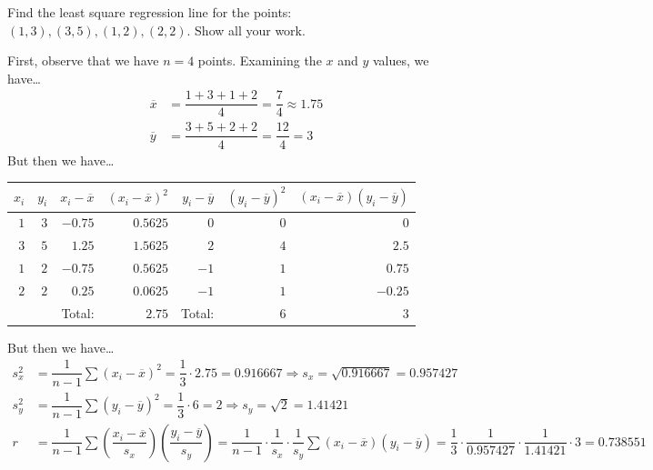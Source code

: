 \documentclass[11pt,letterpaper]{article}
\begin{document}
\newpage



 Find the least square regression line for the points: $(1, 3), (3, 5), (1, 2), (2, 2)$. Show all your work. \pspace

\sol First, observe that we have $n= 4$ points. Examining the $x$ and $y$ values, we have\dots
	\[
	\begin{aligned}
	\overline{x}&= \dfrac{1 + 3 + 1 + 2}{4}= \dfrac{7}{4} \approx 1.75 \\[0.3cm]
	\overline{y}&= \dfrac{3 + 5 + 2 + 2}{4}= \dfrac{12}{4}= 3
	\end{aligned}
	\]
But then we have\dots \par
	\begin{table}[!ht]
	\centering
	\begin{tabular}{rrrrrrr}
	\multicolumn{1}{r|}{$x_i$} & \multicolumn{1}{|r|}{$y_i$} & \multicolumn{1}{|r|}{$x_i - \overline{x}$} & \multicolumn{1}{|r|}{$(x_i - \overline{x})^2$} & \multicolumn{1}{|r|}{$y_i - \overline{y}$} & \multicolumn{1}{|r|}{$(y_i - \overline{y})^2$} & \multicolumn{1}{|r}{$(x_i - \overline{x})(y_i - \overline{y})$} \\ \hline
	\multicolumn{1}{r|}{$1$} & \multicolumn{1}{|r|}{$3$} & \multicolumn{1}{|r|}{$-0.75$} & \multicolumn{1}{|r|}{$0.5625$} & \multicolumn{1}{|r|}{$0$} & \multicolumn{1}{|r|}{$0$} & \multicolumn{1}{|r}{$0$} \\ 
	\multicolumn{1}{r|}{$3$} & \multicolumn{1}{|r|}{$5$} & \multicolumn{1}{|r|}{$1.25$} & \multicolumn{1}{|r|}{$1.5625$} & \multicolumn{1}{|r|}{$2$} & \multicolumn{1}{|r|}{$4$} & \multicolumn{1}{|r}{$2.5$} \\
	\multicolumn{1}{r|}{$1$} & \multicolumn{1}{|r|}{$2$} & \multicolumn{1}{|r|}{$-0.75$} & \multicolumn{1}{|r|}{$0.5625$} & \multicolumn{1}{|r|}{$-1$} & \multicolumn{1}{|r|}{$1$} & \multicolumn{1}{|r}{$0.75$} \\ 
	\multicolumn{1}{r|}{$2$} & \multicolumn{1}{|r|}{$2$} & \multicolumn{1}{|r|}{$0.25$} & \multicolumn{1}{|r|}{$0.0625$} & \multicolumn{1}{|r|}{$-1$} & \multicolumn{1}{|r|}{$1$} & \multicolumn{1}{|r}{$-0.25$} \\ \hline
	& & Total: & $2.75$ & Total: & $6$ & $3$
	\end{tabular}
	\end{table}
But then we have\dots
	\[
	\begin{aligned}
	s_x^2&= \dfrac{1}{n - 1} \sum (x_i - \overline{x})^2= \dfrac{1}{3} \cdot 2.75= 0.916667 \Longrightarrow s_x= \sqrt{0.916667}= 0.957427 \\[0.3cm]
	s_y^2&= \dfrac{1}{n - 1} \sum (y_i - \overline{y})^2= \dfrac{1}{3} \cdot 6= 2 \Longrightarrow s_y= \sqrt{2}= 1.41421 \\[0.3cm]
	r&= \dfrac{1}{n - 1} \sum \left( \dfrac{x_i - \overline{x}}{s_x} \right) \left( \dfrac{y_i - \overline{y}}{s_y} \right)= \dfrac{1}{n - 1} \cdot \dfrac{1}{s_x} \cdot \dfrac{1}{s_y} \sum (x_i - \overline{x})(y_i - \overline{y})= \dfrac{1}{3} \cdot \dfrac{1}{0.957427} \cdot \dfrac{1}{1.41421} \cdot 3= 0.738551
	\end{aligned}
	\]
\end{document}
